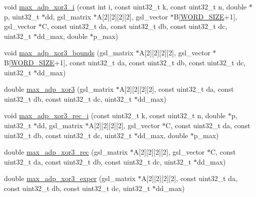 \begin{DoxyCompactItemize}
\item 
void \hyperlink{max-adp-xor3_8cc_ad25cee0908ad1bc426aae280885d7581}{max\-\_\-adp\-\_\-xor3\-\_\-i} (const int i, const uint32\-\_\-t k, const uint32\-\_\-t n, double $\ast$p, uint32\-\_\-t $\ast$dd, gsl\-\_\-matrix $\ast$\-A\mbox{[}2\mbox{]}\mbox{[}2\mbox{]}\mbox{[}2\mbox{]}\mbox{[}2\mbox{]}, gsl\-\_\-vector $\ast$\-B\mbox{[}\hyperlink{common_8hh_a92ed8507d1cd2331ad09275c5c4c1c89}{\-W\-O\-R\-D\-\_\-\-S\-I\-Z\-E}+1\mbox{]}, gsl\-\_\-vector $\ast$\-C, const uint32\-\_\-t da, const uint32\-\_\-t db, const uint32\-\_\-t dc, uint32\-\_\-t $\ast$dd\-\_\-max, double $\ast$p\-\_\-max)
\item 
void \hyperlink{max-adp-xor3_8cc_a7134183c8951be68d7e94f47793d2f0d}{max\-\_\-adp\-\_\-xor3\-\_\-bounds} (gsl\-\_\-matrix $\ast$\-A\mbox{[}2\mbox{]}\mbox{[}2\mbox{]}\mbox{[}2\mbox{]}\mbox{[}2\mbox{]}, gsl\-\_\-vector $\ast$\-B\mbox{[}\hyperlink{common_8hh_a92ed8507d1cd2331ad09275c5c4c1c89}{\-W\-O\-R\-D\-\_\-\-S\-I\-Z\-E}+1\mbox{]}, const uint32\-\_\-t da, const uint32\-\_\-t db, const uint32\-\_\-t dc, uint32\-\_\-t $\ast$dd\-\_\-max)
\item 
double \hyperlink{max-adp-xor3_8cc_aa606808c54de33ad16170106454312a7}{max\-\_\-adp\-\_\-xor3} (gsl\-\_\-matrix $\ast$\-A\mbox{[}2\mbox{]}\mbox{[}2\mbox{]}\mbox{[}2\mbox{]}\mbox{[}2\mbox{]}, const uint32\-\_\-t da, const uint32\-\_\-t db, const uint32\-\_\-t dc, uint32\-\_\-t $\ast$dd\-\_\-max)
\item 
void \hyperlink{max-adp-xor3_8cc_a6033c1a639b25e76ffcecd62569fbd05}{max\-\_\-adp\-\_\-xor3\-\_\-rec\-\_\-i} (const uint32\-\_\-t k, const uint32\-\_\-t n, double $\ast$p, uint32\-\_\-t $\ast$dd, gsl\-\_\-matrix $\ast$\-A\mbox{[}2\mbox{]}\mbox{[}2\mbox{]}\mbox{[}2\mbox{]}\mbox{[}2\mbox{]}, gsl\-\_\-vector $\ast$\-C, const uint32\-\_\-t da, const uint32\-\_\-t db, const uint32\-\_\-t dc, uint32\-\_\-t $\ast$dd\-\_\-max, double $\ast$p\-\_\-max)
\item 
double \hyperlink{max-adp-xor3_8cc_ad2234c23808b10a3c3b64962c4d24198}{max\-\_\-adp\-\_\-xor3\-\_\-rec} (gsl\-\_\-matrix $\ast$\-A\mbox{[}2\mbox{]}\mbox{[}2\mbox{]}\mbox{[}2\mbox{]}\mbox{[}2\mbox{]}, gsl\-\_\-vector $\ast$\-C, const uint32\-\_\-t da, const uint32\-\_\-t db, const uint32\-\_\-t dc, uint32\-\_\-t $\ast$dd\-\_\-max)
\item 
double \hyperlink{max-adp-xor3_8cc_a44675228e7739c23660939671bc022c4}{max\-\_\-adp\-\_\-xor3\-\_\-exper} (gsl\-\_\-matrix $\ast$\-A\mbox{[}2\mbox{]}\mbox{[}2\mbox{]}\mbox{[}2\mbox{]}\mbox{[}2\mbox{]}, const uint32\-\_\-t da, const uint32\-\_\-t db, const uint32\-\_\-t dc, uint32\-\_\-t $\ast$dd\-\_\-max)
\end{DoxyCompactItemize}


